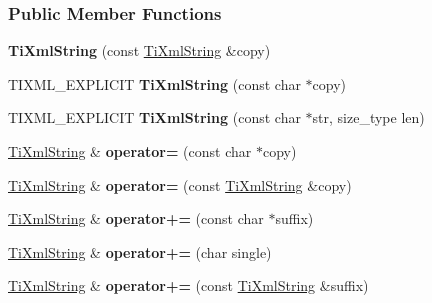 \subsubsection*{Public Member Functions}
\begin{DoxyCompactItemize}
\item 
\hypertarget{class_ti_xml_string_ac80fe17693a438c9ab2591664743fcb6}{
{\bfseries TiXmlString} (const \hyperlink{class_ti_xml_string}{TiXmlString} \&copy)}
\label{class_ti_xml_string_ac80fe17693a438c9ab2591664743fcb6}

\item 
\hypertarget{class_ti_xml_string_aa3b32bd2891a757c9f36c21db44c81d2}{
TIXML\_\-EXPLICIT {\bfseries TiXmlString} (const char $\ast$copy)}
\label{class_ti_xml_string_aa3b32bd2891a757c9f36c21db44c81d2}

\item 
\hypertarget{class_ti_xml_string_a4b17ea5c5db986f14827223dfa8f1547}{
TIXML\_\-EXPLICIT {\bfseries TiXmlString} (const char $\ast$str, size\_\-type len)}
\label{class_ti_xml_string_a4b17ea5c5db986f14827223dfa8f1547}

\item 
\hypertarget{class_ti_xml_string_ae0bc6147afc0ec2aa0da3a3c0a8fcfb0}{
\hyperlink{class_ti_xml_string}{TiXmlString} \& {\bfseries operator=} (const char $\ast$copy)}
\label{class_ti_xml_string_ae0bc6147afc0ec2aa0da3a3c0a8fcfb0}

\item 
\hypertarget{class_ti_xml_string_ab1f1f5d3eceaa0f22d0a7e6055ea81b0}{
\hyperlink{class_ti_xml_string}{TiXmlString} \& {\bfseries operator=} (const \hyperlink{class_ti_xml_string}{TiXmlString} \&copy)}
\label{class_ti_xml_string_ab1f1f5d3eceaa0f22d0a7e6055ea81b0}

\item 
\hypertarget{class_ti_xml_string_ab56336ac2aa2a08d24a71eb9a2b502a5}{
\hyperlink{class_ti_xml_string}{TiXmlString} \& {\bfseries operator+=} (const char $\ast$suffix)}
\label{class_ti_xml_string_ab56336ac2aa2a08d24a71eb9a2b502a5}

\item 
\hypertarget{class_ti_xml_string_a6aa09d5240470b76d54ec709e04f8c13}{
\hyperlink{class_ti_xml_string}{TiXmlString} \& {\bfseries operator+=} (char single)}
\label{class_ti_xml_string_a6aa09d5240470b76d54ec709e04f8c13}

\item 
\hypertarget{class_ti_xml_string_afdcae5ea2b4d9e194dc21226b817f417}{
\hyperlink{class_ti_xml_string}{TiXmlString} \& {\bfseries operator+=} (const \hyperlink{class_ti_xml_string}{TiXmlString} \&suffix)}
\label{class_ti_xml_string_afdcae5ea2b4d9e194dc21226b817f417}


\end{DoxyCompactItemize}
